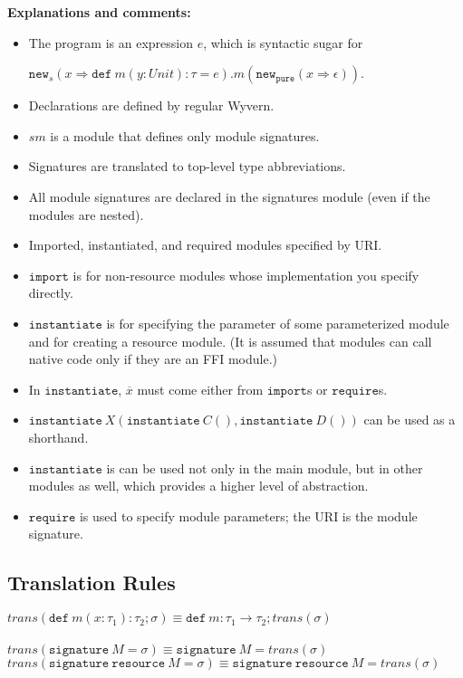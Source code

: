 \documentclass{llncs}
\newcommand{\keywadj}[1]{\mathtt{#1}}
\newcommand{\keyw}[1]{\keywadj{#1}~}
\begin{document}
\noindent\textbf{Explanations and comments:}
\begin{itemize}
\item The program is an expression $e$, which is syntactic sugar for

$\keywadj{new}_s(x \Rightarrow \keyw{def} m(y : Unit) : \tau = e).m(\keywadj{new}_{\keywadj{pure}}(x \Rightarrow \epsilon))$.
\item Declarations are defined by regular Wyvern.
\item $sm$ is a module that defines only module signatures.
\item Signatures are translated to top-level type abbreviations.
\item All module signatures are declared in the signatures module (even if the modules are nested).\item Imported, instantiated, and required modules specified by URI.
\item $\keywadj{import}$ is for non-resource modules whose implementation you specify directly.
\item $\keywadj{instantiate}$ is for specifying the parameter of some parameterized module and for creating a resource module. (It is assumed that modules can call native code only if they are an FFI module.)
\item In $\keywadj{instantiate}$, $\overline{x}$ must come either from $\keywadj{import}$s or $\keywadj{require}$s.
\item $\keyw{instantiate} X(\keyw{instantiate} C(), \keyw{instantiate} D())$ can be used as a shorthand.
\item $\keywadj{instantiate}$ is can be used not only in the main module, but in other modules as well, which provides a higher level of abstraction.
\item $\keywadj{require}$ is used to specify module parameters; the URI is the module signature.

\end{itemize}


\newpage

\subsection{Translation Rules}

$\textit{trans}(\keyw{def} m(x : \tau_1) : \tau_2; \sigma) \equiv \keyw{def} m : \tau_1 \rightarrow \tau_2; trans(\sigma)$\\
\\
$\textit{trans}(\keyw{signature} M = \sigma) \equiv \keyw{signature} M = trans(\sigma)$ \\
$\textit{trans}(\keyw{signature} \keyw{resource} M = \sigma) \equiv \keyw{signature} \keyw{resource} M = trans(\sigma)$ \\
\end{document}
